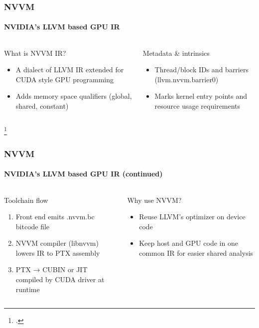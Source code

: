 \documentclass[aspectratio=169]{beamer}
\begin{document}
\begin{frame}
	\frametitle{NVVM}
	\framesubtitle{NVIDIA’s LLVM based GPU IR}

	\begin{columns}[T]
		\begin{column}{0.4\textwidth}
			What is NVVM IR? \footnotemark
			\begin{itemize}
				\item A dialect of LLVM IR extended for CUDA style GPU programming
				\item Adds memory space qualifiers (global, shared, constant)
			\end{itemize}
		\end{column}
		\begin{column}{0.4\textwidth}
			Metadata \& intrinsics
			\begin{itemize}
				\item Thread/block IDs and barriers (llvm.nvvm.barrier0)
				\item Marks kernel entry points and resource usage requirements
			\end{itemize}
		\end{column}
	\end{columns}
	\footcitetext{supercomputing}
\end{frame}

\begin{frame}
	\frametitle{NVVM}
	\framesubtitle{NVIDIA’s LLVM based GPU IR (continued)}

	\begin{columns}[T]
		\begin{column}{0.4\textwidth}
			Toolchain flow
			\begin{enumerate}
				\item Front end emits .nvvm.bc bitcode file
				\item NVVM compiler (libnvvm) lowers IR to PTX assembly
				\item PTX → CUBIN or JIT compiled by CUDA driver at runtime
			\end{enumerate}
		\end{column}
		\begin{column}{0.4\textwidth}
			Why use NVVM?
			\begin{itemize}
				\item Reuse LLVM’s optimizer on device code
				\item Keep host and GPU code in one common IR for easier shared analysis
			\end{itemize}
		\end{column}
	\end{columns}
\end{frame}
\end{document}
